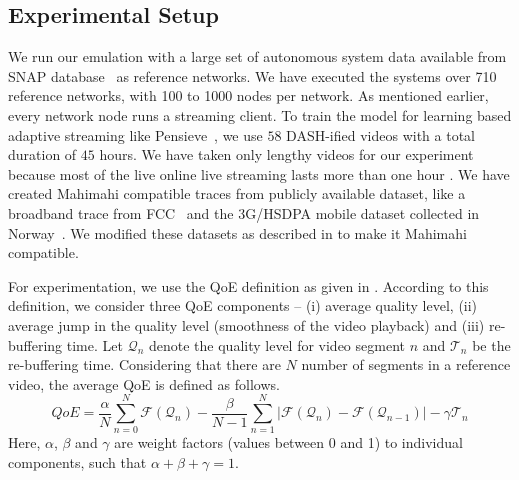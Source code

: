 \subsection{Experimental Setup}
We run our emulation with a large set of autonomous system data available from SNAP database~\cite{ASDataSet} as reference networks. We have executed the systems over 710 reference networks, with 100 to 1000 nodes per network. As mentioned earlier, every network node runs a streaming client. To train the model for learning based adaptive streaming like Pensieve~\cite{Pensieve}, we use $58$ DASH-ified videos with a total duration of $45$ hours. We have taken only lengthy videos for our experiment because most of the live online live streaming lasts more than one hour \cite{LiveStreamDuration1,LiveStreamDuration2}. We have created Mahimahi compatible traces from publicly available dataset, like a broadband trace from FCC~\cite{dataset-fcc} and the 3G/HSDPA mobile dataset collected in Norway~\cite{dataset-norway}. We modified these datasets as described in \cite{Pensieve} to make it Mahimahi compatible.

For experimentation, we use the QoE definition as given in \cite{Pensieve}. According to this definition, we consider three QoE components -- (i) average quality level, (ii) average jump in the quality level (smoothness of the video playback) and (iii) re-buffering time. Let $\mathcal{Q}_n$ denote the quality level for video segment $n$ and $\mathcal{T}_n$ be the re-buffering time. Considering that there are $N$ number of segments in a reference video, the average QoE is defined as follows. 
\begin{equation}
QoE = \frac{\alpha}{N}\sum_{n=0}^{N} \mathcal{F}(\mathcal{Q}_n) - \frac{\beta}{N-1} \sum_{n=1}^{N}\lvert\mathcal{F}(\mathcal{Q}_n) -\mathcal{F}(\mathcal{Q}_{n-1})\rvert - \gamma\mathcal{T}_n
\label{eqn:QoE}
\end{equation}
Here, $\alpha$, $\beta$ and $\gamma$ are weight factors (values between 0 and 1) to individual components, such that $\alpha + \beta + \gamma = 1$. 


%


